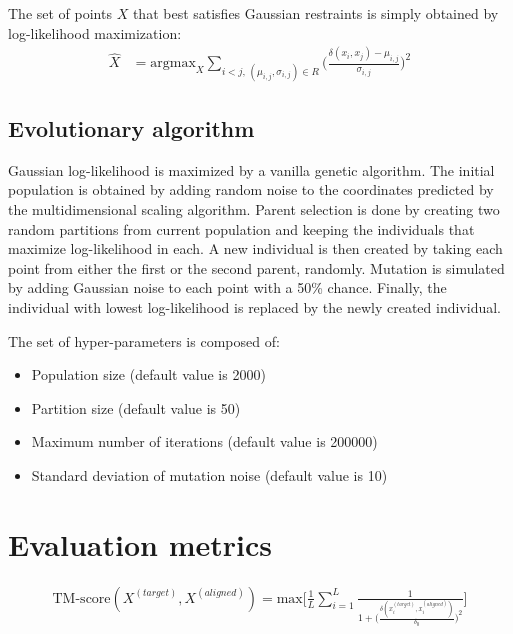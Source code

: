         The set of points $X$ that best satisfies Gaussian restraints is simply
        obtained by log-likelihood maximization:
        \begin{align}
            \hat{X} & = \text{argmax}_{X} \sum\limits_{i < j ,\, (\mu_{i,j}, \sigma_{i,j}) \in R}
                \Bigg(\frac{\delta(x_i, x_j) - \mu_{i,j}}{\sigma_{i,j}}\Bigg)^2
        \end{align}

    \subsection{Evolutionary algorithm}

        Gaussian log-likelihood is maximized by a vanilla genetic algorithm.
        The initial population is obtained by adding random noise to the coordinates
        predicted by the multidimensional scaling algorithm.
        Parent selection is done by creating two random partitions from current population
        and keeping the individuals that maximize log-likelihood in each.
        A new individual is then created by taking each point from either the first
        or the second parent, randomly. Mutation is simulated by adding Gaussian noise
        to each point with a 50\% chance.
        Finally, the individual with lowest log-likelihood is replaced by the
        newly created individual.

        The set of hyper-parameters is composed of:
        \begin{itemize}
            \item Population size (default value is 2000)
            \item Partition size (default value is 50)
            \item Maximum number of iterations (default value is 200000)
            \item Standard deviation of mutation noise (default value is 10)
        \end{itemize}

    \section{Evaluation metrics}

    \begin{align}
        \text{TM-score}(X^{(target)}, X^{(aligned)}) = \text{max} \Bigg[ \frac{1}{L} \sum\limits_{i=1}^L 
            \frac{1}{1 + \Big(\frac{\delta(x_i^{(target)}, x_i^{(aligned)})}{\delta_0}\Big)^2} \Bigg]
    \end{align}

